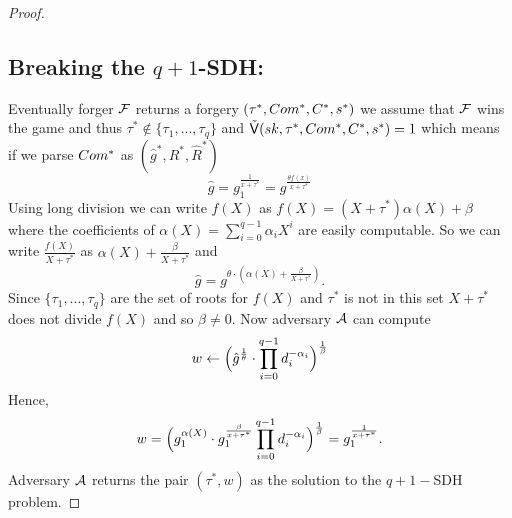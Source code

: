 \begin{proof}
\subsection*{Breaking the $q+1$-SDH:}
Eventually forger $\mathcal{F}$ returns a forgery $(\tau^*,Com^*,C^*,s^*)$ we assume that $\mathcal{F}$ wins the game and thus $\tau^* \notin \{\tau_1,...,\tau_q\}$ and 
$\tilde{\mathsf{V}}(sk, \tau^*,Com^*,C^*,s^*) = 1$ which means if we parse $Com^*$ as $(\hat{g}^*,R^*,\hat{R}^*)$
$$\hat{g} = g_1^{\frac{1}{x+\tau^*}} = g^{\frac{\theta f(x)}{x+\tau^*}}$$
Using long division we can write $f(X)$ as $f(X) = (X+\tau^*)\alpha(X) + \beta$  where the coefficients of $\alpha(X) = \sum_{i=0}^{q-1} \alpha_iX^i$ are easily computable. So we can write $\frac{f(X)}{X+\tau^*}$ as $\alpha(X) + \frac{\beta}{X+\tau^*}$ and 
$$\hat{g} = g^{\theta\cdot(\alpha(X) + \frac{\beta}{X+\tau^*})}.$$
Since $\{\tau_1,...,\tau_q\}$ are the set of roots for $f(X)$ and $\tau^*$ is not in this set $X+\tau^*$ does not divide $f(X)$ and so $\beta \neq 0$. Now adversary $\mathcal{A}$ can compute
$$w \leftarrow \Big{(} \hat{g}^{\frac{1}{\theta}} \cdot \prod_{i=0}^{q-1} d_i^{-\alpha_i}\Big{)}^{\frac{1}{\beta}}$$
Hence,
$$w =\Big{(} g_1^{\alpha(X)}\cdot g_1^{\frac{\beta}{x+\tau^*}}  \prod_{i=0}^{q-1} d_i^{-\alpha_i}\Big{)}^{\frac{1}{\beta}} = g_1^{\frac{1}{x+\tau^*}}.$$
Adversary $\mathcal{A}$ returns the pair $(\tau^*, w)$ as the solution to the $q+1-$SDH problem.

\end{proof}  